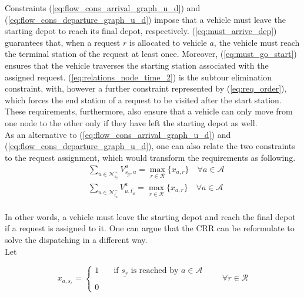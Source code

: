 Constraints (\ref{eq:flow_cons_arrival_graph_u_d}) and (\ref{eq:flow_cons_departure_graph_u_d}) impose that a vehicle must leave the starting depot to reach its final depot, respectively. (\ref{eq:must_arrive_dep}) guarantees that, when a request $r$ is allocated to vehicle $a$, the vehicle must reach the terminal station of the request at least once. Moreover, (\ref{eq:must_go_start}) ensures that the vehicle traverses the starting station associated with the assigned request. (\ref{eq:relations_node_time_2}) is the subtour elimination constraint, with, however a further constraint represented by (\ref{eq:req_order}), which forces the end station of a request to be visited after the start station. \\
These requirements, furthermore, also ensure that a vehicle can only move from one node to the other only if they have left the starting depot as well. \\ 
As an alternative to (\ref{eq:flow_cons_arrival_graph_u_d}) and (\ref{eq:flow_cons_departure_graph_u_d}), one can also relate the two constraints to the request assignment, which would transform the requirements as following. 
\begin{align}
	&\sum_{ u \in \mathcal{N}^+_{\underline{s_a}} }V^a_{ \underline{s_a},u} = \underset{ r \in \mathcal{R}}{\max}\{x_{a,r}\} \quad  \forall a \in \mathcal{A}
	\label{eq:flow_cons_arrival_graph_u_d2}\\ %
	&\sum_{u \in \mathcal{N}^-_{\bar{t_a}} } V^a_{u, \bar{t_a}} = \underset{ r \in \mathcal{R}}{\max}\{x_{a,r}\}  \quad  \forall a \in \mathcal{A}\label{eq:flow_cons_departure_graph_u_d2}
\end{align}
\\

In other words, a vehicle must leave the starting depot and reach the final depot if a request is assigned to it. 
\iffalse
One can argue that the CRR can be reformulate to solve the dispatching in a different way. \\
Let 

\begin{equation*}
	x_{a,\underline{s_r} }= 
	\begin{cases} 
		1 & \quad \text{if $\underline{s_r} $ is reached by }  a \in \mathcal{A}\\
		\\
		0
	\end{cases}
	\quad\quad \forall r \in \mathcal{R}
	\label{eq:var_dispatching}
\end{equation*}

